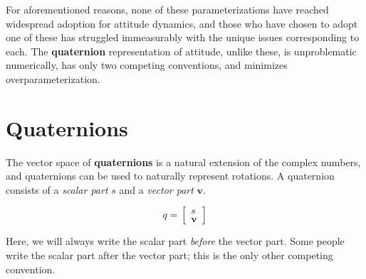 \documentclass[12pt]{article}
\begin{document}
    For aforementioned reasons, none of these parameterizations have reached widespread adoption for attitude dynamics, and those who have chosen to adopt one of these has struggled immeasurably with the unique issues corresponding to each.  The \textbf{quaternion} representation of attitude, unlike these, is unproblematic numerically, has only two competing conventions, and minimizes overparameterization.

    \section{Quaternions}

    The vector space of \textbf{quaternions} is a natural extension of the complex numbers, and quaternions can be used to naturally represent rotations.  A quaternion consists of a \textit{scalar part} \( s \) and a \textit{vector part} \( \mathbf{v} \).

    \begin{equation}
        q = \begin{bmatrix} s \\ \mathbf{v} \end{bmatrix}
    \end{equation}

    Here, we will always write the scalar part \textit{before} the vector part.  Some people write the scalar part after the vector part; this is the only other competing convention.
\end{document}
